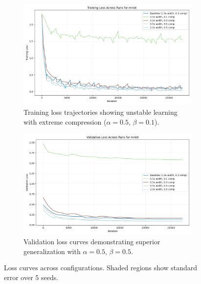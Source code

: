 \documentclass{article} %
\begin{document}
\begin{figure}[h]
    \centering
    \begin{subfigure}{0.49\textwidth}
        \includegraphics[width=\textwidth]{train_loss_mnist_across_runs.png}
        \caption{Training loss trajectories showing unstable learning with extreme compression ($\alpha=0.5$, $\beta=0.1$).}
        \label{fig:train-loss}
    \end{subfigure}
    \hfill
    \begin{subfigure}{0.49\textwidth}
        \includegraphics[width=\textwidth]{val_loss_mnist_across_runs.png}
        \caption{Validation loss curves demonstrating superior generalization with $\alpha=0.5$, $\beta=0.5$.}
        \label{fig:val-loss}
    \end{subfigure}
    \caption{Loss curves across configurations. Shaded regions show standard error over 5 seeds.}
    \label{fig:loss-curves}
\end{figure}
\end{document}

